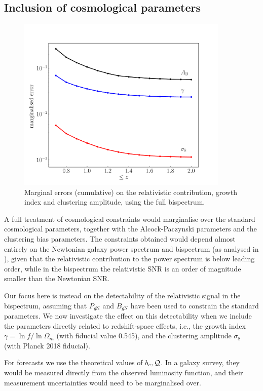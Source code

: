 \subsection{Inclusion of cosmological parameters}
\begin{figure}[!ht]
\centering
\includegraphics[width=0.9\textwidth]{fig/gamma_sigma8_AD-eps-converted-to}
\caption{Marginal errors (cumulative) on the relativistic contribution, growth index and clustering amplitude, using the full bispectrum.} \label{sig}
\end{figure}
{A full treatment of cosmological constraints would marginalise over the standard cosmological parameters, together with the Alcock-Paczynski parameters and the clustering bias parameters. The constraints obtained would depend almost entirely on the Newtonian galaxy power spectrum and bispectrum (as analysed in \cite{Yankelevich:2018uaz}), given that the relativistic contribution to the power spectrum is below leading order, while in the bispectrum the relativistic SNR is  an order of magnitude smaller than the Newtonian SNR. 

Our focus here is instead on the detectability of the relativistic signal in the bispectrum, {assuming that $P_{g\mathrm{N}}$ and $B_{g\mathrm{N}}$ have been used to constrain the standard parameters.}
We now investigate the effect on this detectability when we include the parameters directly related to redshift-space effects, i.e.,  the growth index $\gamma=\ln f/ \ln\Omega_m$ (with fiducial value 0.545), and the clustering amplitude $\sigma_8$ (with Planck 2018 fiducial).} 
{For forecasts we use the theoretical values of $b_e, \mathcal{Q}$. In a galaxy survey, they would be measured directly from the observed luminosity function, and their measurement uncertainties would need to be marginalised over.}


